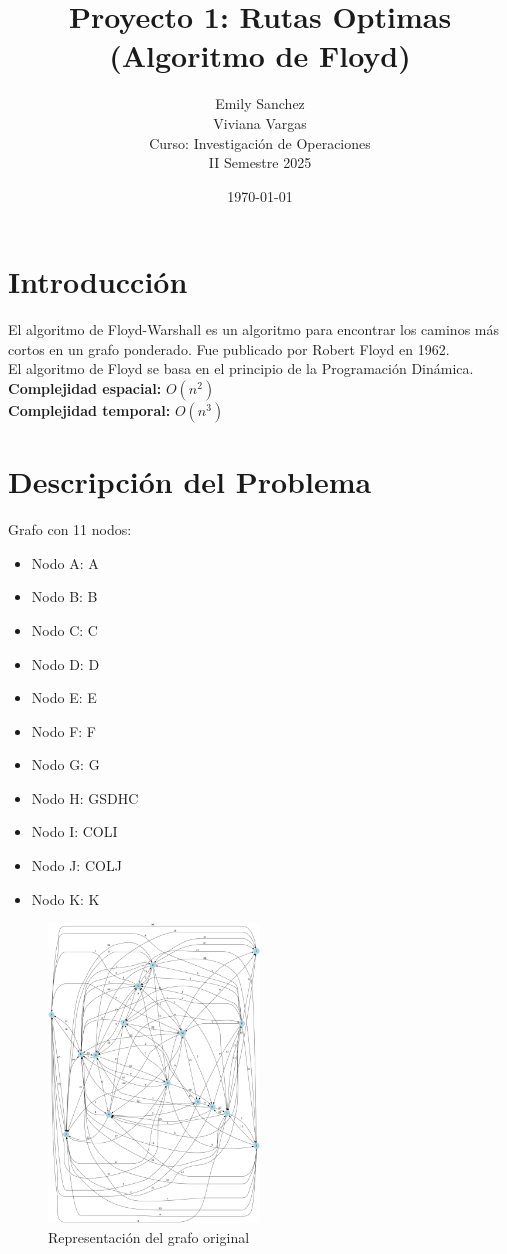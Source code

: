 \documentclass[12pt]{article}
\title{Proyecto 1: Rutas Optimas (Algoritmo de Floyd)}
\author{Emily Sanchez \\ Viviana Vargas \\[1cm] Curso: Investigación de Operaciones \\ II Semestre 2025}
\date{\today}
\begin{document}
\maketitle
\thispagestyle{empty}
\newpage
\setcounter{page}{1}

\section{Introducción}
El algoritmo de Floyd-Warshall es un algoritmo para encontrar los caminos más cortos en un grafo ponderado. Fue publicado por Robert Floyd en 1962.\\
El algoritmo de Floyd se basa en el principio de la Programación Dinámica.\\
\textbf{Complejidad espacial:} $O(n^2)$\\
\textbf{Complejidad temporal:} $O(n^3)$\\
\clearpage
\section{Descripción del Problema}
Grafo con 11 nodos:

\begin{itemize}
\item Nodo A: A
\item Nodo B: B
\item Nodo C: C
\item Nodo D: D
\item Nodo E: E
\item Nodo F: F
\item Nodo G: G
\item Nodo H: GSDHC
\item Nodo I: COLI
\item Nodo J: COLJ
\item Nodo K: K
\end{itemize}

\begin{figure}[h!]
\centering
\includegraphics[width=0.5\textwidth,keepaspectratio]{grafo.png}
\caption{Representación del grafo original}
\end{figure}
\end{document}

